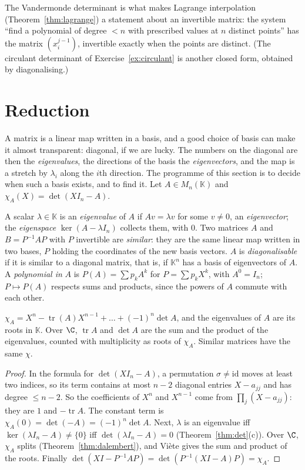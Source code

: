The Vandermonde determinant is what makes Lagrange interpolation (Theorem~\ref{thm:lagrange}) a statement about an invertible matrix: the system ``find a polynomial of degree $<n$ with prescribed values at $n$ distinct points'' has the matrix $(x_i^{j-1})$, invertible exactly when the points are distinct. (The circulant determinant of Exercise~\ref{ex:circulant} is another closed form, obtained by diagonalising.)

\section{Reduction}

A matrix is a linear map written in a basis, and a good choice of basis can make it almost transparent: diagonal, if we are lucky. The numbers on the
diagonal are then the \emph{eigenvalues}, the directions of the basis the \emph{eigenvectors}, and the map is a stretch by $\lambda_i$ along the
$i$th direction. The programme of this section is to decide when such a basis exists, and to find it. Let $A\in M_n(\mathbb K)$ and $\chi_A(X)=\det(XI_n-A)$.

\begin{reminder}
A scalar $\lambda\in\mathbb K$ is an \emph{eigenvalue} of $A$ if $Av=\lambda v$ for some $v\ne0$, an \emph{eigenvector}; the \emph{eigenspace} $\ker(A-\lambda I_n)$ collects them, with $0$. Two matrices $A$ and $B=P^{-1}AP$ with $P$ invertible are \emph{similar}: they are the same linear map written in two bases, $P$ holding the coordinates of the new basis vectors. $A$ is \emph{diagonalisable} if it is similar to a diagonal matrix, that is, if $\mathbb K^n$ has a basis of eigenvectors of $A$. A \emph{polynomial in} $A$ is $P(A)=\sum p_kA^k$ for $P=\sum p_kX^k$, with $A^0=I_n$; $P\mapsto P(A)$ respects sums and products, since the powers of $A$ commute with each other.
\end{reminder}

\begin{proposition}\label{prop:charpoly}
$\chi_A=X^n-\operatorname{tr}(A)X^{n-1}+\dots+(-1)^n\det A$, and the eigenvalues of $A$ are its roots in $\mathbb K$. Over $\C$, $\operatorname{tr}A$ and $\det A$ are the sum and the product of the eigenvalues, counted with multiplicity as roots of $\chi_A$. Similar matrices have the same $\chi$.
\end{proposition}
\begin{proof}
In the formula for $\det(XI_n-A)$, a permutation $\sigma\ne\mathrm{id}$ moves at least two indices, so its term contains at most $n-2$ diagonal entries $X-a_{jj}$ and has degree $\le n-2$. So the coefficients of $X^n$ and $X^{n-1}$ come from $\prod_j(X-a_{jj})$: they are $1$ and $-\operatorname{tr}A$. The constant term is $\chi_A(0)=\det(-A)=(-1)^n\det A$. Next, $\lambda$ is an eigenvalue iff $\ker(\lambda I_n-A)\ne\{0\}$ iff $\det(\lambda I_n-A)=0$ (Theorem~\ref{thm:det}(c)). Over $\C$, $\chi_A$ splits (Theorem~\ref{thm:dalembert}), and Vi\`ete gives the sum and product of the roots. Finally $\det(XI-P^{-1}AP)=\det\left(P^{-1}(XI-A)P\right)=\chi_A$.
\end{proof}

